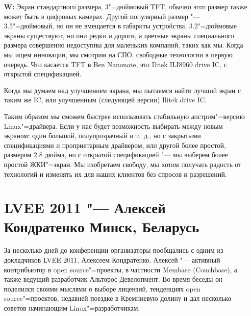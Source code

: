 \documentclass[10pt, a5paper]{article}
\begin{document}
{\noindent \bf W:} Экран стандартного размера, 3"=дюймовый TFT, обычно этот размер также может быть в цифровых камерах. Другой популярный размер "--- 3.5"=дюймовый, но он не вмещается в габариты устройства. 3.2"=дюймовые экраны существуют, но они редки и дороги, а цветные экраны специального размера совершенно недоступны для маленьких компаний, таких как мы. Когда мы ищем инновации, мы смотрим на СПО, свободные технологии в первую очередь. Что касается TFT в Ben Nanonote, это Ilitek ILI8960 drive IC, с открытой спецификацией.

Когда мы думаем над улучшением экрана, мы пытаемся найти лучший экран с таким же IC, или улучшенным (следующей версии) Ilitek drive IC.

Таким образом мы сможем быстрее использовать стабильную апстрим"=версию Linux"=драйвера. Если у нас будет возможность выбирать между новым экраном: один большой, полупрозрачный и т.~д., но с закрытыми спецификациями и проприетарным драйвером, или другой более простой, размером 2.8 дюйма, но с открытой спецификацией "--- мы выберем более простой ЖКИ"=экран. Мы изобретаем свободу, мы хотим получать радость от технологий и изменять их для наших клиентов без спросов и разрешений.

\section*{\flushleft LVEE 2011 "--- Алексей Кондратенко \linebreak Минск, Беларусь}

\begin{figure}[ht]
\end{figure}

За несколько дней до конференции организаторы пообщались с одним из докладчиков LVEE-2011, Алексеем Кондратенко. Алексей "--- активный контрибьютор в open source"=проекты, в частности Membase (Couchbase), а также ведущий разработчик Альторос Девелопмент. Во время беседы он поделился своими мыслями о выборе лицензий, тенденциях open source"=проектов, недавней поездке в Кремниевую долину и дал несколько советов начинающим Linux"=разработчикам.
\end{document}
